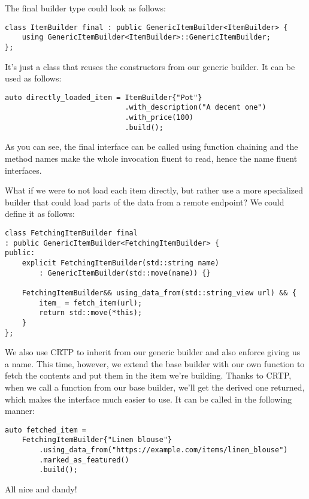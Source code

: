 The final builder type could look as follows:

\begin{lstlisting}[style=styleCXX]
class ItemBuilder final : public GenericItemBuilder<ItemBuilder> {
	using GenericItemBuilder<ItemBuilder>::GenericItemBuilder;
};
\end{lstlisting}

It's just a class that reuses the constructors from our generic builder. It can be used as follows:

\begin{lstlisting}[style=styleCXX]
auto directly_loaded_item = ItemBuilder{"Pot"}
							.with_description("A decent one")
							.with_price(100)
							.build();
\end{lstlisting}

As you can see, the final interface can be called using function chaining and the method names make the whole invocation fluent to read, hence the name fluent interfaces.

What if we were to not load each item directly, but rather use a more specialized builder that could load parts of the data from a remote endpoint? We could define it as follows:

\begin{lstlisting}[style=styleCXX]
class FetchingItemBuilder final
: public GenericItemBuilder<FetchingItemBuilder> {
public:
	explicit FetchingItemBuilder(std::string name)
		: GenericItemBuilder(std::move(name)) {}
	
	FetchingItemBuilder&& using_data_from(std::string_view url) && {
		item_ = fetch_item(url);
		return std::move(*this);
    }
};
\end{lstlisting}

We also use CRTP to inherit from our generic builder and also enforce giving us a name. This time, however, we extend the base builder with our own function to fetch the contents and put them in the item we're building. Thanks to CRTP, when we call a function from our base builder, we'll get the derived one returned, which makes the interface much easier to use. It can be called in the following manner:

\begin{lstlisting}[style=styleCXX]
auto fetched_item =
	FetchingItemBuilder{"Linen blouse"}
		.using_data_from("https://example.com/items/linen_blouse")
		.marked_as_featured()
		.build();
\end{lstlisting}

All nice and dandy!

